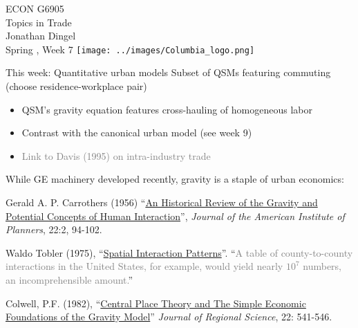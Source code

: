 \documentclass[11pt,notes=hide,aspectratio=169]{beamer}
\begin{document}
\begin{frame}[plain]
\begin{center}
\large
\textcolor{columbiadarkblue}{ECON G6905\\
Topics in Trade\\ 
Jonathan Dingel\\
Spring \the\year, Week 7}
\vfill 
\texttt{[image: ../images/Columbia\_logo.png]}
\end{center}
\end{frame}
\begin{frame}{This week: Quantitative urban models}
Subset of QSMs featuring commuting (choose residence-workplace pair)
\begin{itemize}
\item QSM's gravity equation features cross-hauling of homogeneous labor
\item Contrast with the canonical urban model (see week 9)\\
\item[] \textcolor{gray}{Link to Davis (1995) on intra-industry trade}
\end{itemize}
\smallskip
While GE machinery developed recently, gravity is a staple of urban economics:
\begin{itemize}{\small
\item Gerald A. P. Carrothers (1956) ``\href{https://doi.org/10.1080/01944365608979229}{An Historical Review of the Gravity and Potential Concepts of Human Interaction}'', \textit{Journal of the American Institute of Planners}, 22:2, 94-102.
\item Waldo Tobler (1975), ``\href{https://pure.iiasa.ac.at/id/eprint/241/1/RR-75-019.pdf}{Spatial Interaction Patterns}''. ``\textcolor{gray}{A table of county-to-county interactions in the United States, for example, would yield nearly $10^7$ numbers, an incomprehensible amount.}''
\item Colwell, P.F. (1982), ``\href{https://doi.org/10.1111/j.1467-9787.1982.tb00775.x}{Central Place Theory and The Simple Economic Foundations of the Gravity Model}'' \textit{Journal of Regional Science}, 22: 541-546.
}\end{itemize}
\end{frame}
\end{document}
